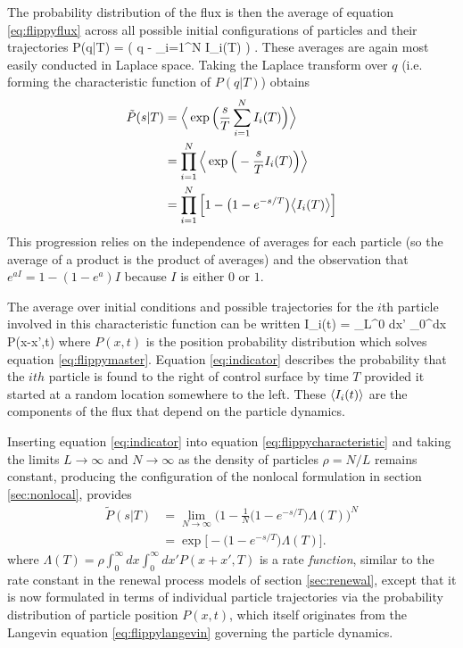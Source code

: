 The probability distribution of the flux is then the average of equation \ref{eq:flippyflux} across all possible initial configurations of particles and their trajectories
\be P(q|T) = \Big \bra \delta\Big( q - \sum_{i=1}^N I_i(T) \Big) \Big\ket. \ee
These averages are again most easily conducted in Laplace space. 
Taking the Laplace transform over $q$ (i.e. forming the characteristic function of $P(q|T)$) obtains
\begin{align} \tilde{P}(s|T) &=  \Big\langle \exp\Big(\frac{s}{T}\sum_{i=1}^N I_i(T)\Big)\Big\rangle \\
	&=  \prod_{i=1}^N \Big\langle \exp\Big(-\frac{s}{T}I_i(T)\Big)\Big\rangle \\
	&= \prod_{i=1}^N \Big[1-\big(1-e^{-s/T}\big)\big\langle I_i(T) \big\rangle \Big] \label{eq:flippycharacteristic}\end{align}
This progression relies on the independence of averages for each particle (so the average of a product is the product of averages) and the observation that  $e^{a I} = 1-(1-e^a)I$ because $I$ is either $0$ or $1$.

The average over initial conditions and possible trajectories for the $i$th particle involved in this characteristic function can be written
\be \bra I_i(t) \ket = \int_L^0 dx' \int_0^\infty dx P(x-x',t) \label{eq:indicator} \ee
where $P(x,t)$ is the position probability distribution which solves equation \ref{eq:flippymaster}.
Equation \ref{eq:indicator} describes the probability that the $ith$ particle is found to the right of control surface by time $T$ provided it started at a random location somewhere to the left.
These $\langle I_i(t) \rangle$ are the components of the flux that depend on the particle dynamics. 

Inserting equation \ref{eq:indicator} into equation \ref{eq:flippycharacteristic} and taking the limits $L\rightarrow \infty$ and $N \rightarrow \infty$ as the density of particles $\rho = N/L$ remains constant, producing the configuration of the nonlocal formulation in section \ref{sec:nonlocal}, provides
\begin{align} \tilde{P}(s|T) &= \lim_{N \rightarrow \infty} \Big(1 - \frac{1}{N}\big(1-e^{-s/T}\big)\Lambda(T) \Big)^N \\ &= \exp \Big[ -\big(1-e^{-s/T}\big)\Lambda(T) \Big]. \label{eq:flippychar} \end{align}
where $\Lambda(T) = \rho \int_0^\infty dx \int_0^\infty dx' P(x+x',T)$ is a rate \textit{function}, similar to the rate constant in the renewal process models of section \ref{sec:renewal}, except that it is now formulated in terms of individual particle trajectories via the probability distribution of particle position $P(x,t)$, which itself originates from the Langevin equation \ref{eq:flippylangevin} governing the particle dynamics.

